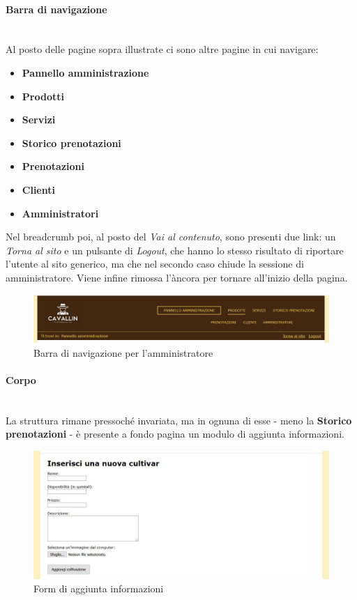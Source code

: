 \paragraph{Barra di navigazione}
~\\Al posto delle pagine sopra illustrate ci sono altre pagine in cui navigare:
\begin{itemize}
	\item \textbf{Pannello amministrazione}
	\item \textbf{Prodotti}
	\item \textbf{Servizi}
	\item \textbf{Storico prenotazioni}
	\item \textbf{Prenotazioni}
	\item \textbf{Clienti}
	\item \textbf{Amministratori}
\end{itemize}
Nel breadcrumb poi, al posto del \emph{Vai al contenuto}, sono presenti due link: un \emph{Torna al sito} e un pulsante di \emph{Logout}, che hanno lo stesso risultato di riportare l'utente al sito generico, ma che nel secondo caso chiude la sessione di amministratore. Viene infine rimossa l'àncora per tornare all'inizio della pagina.
\begin{figure}[h!]
	\centerline{\includegraphics[scale=0.49]{img/barra_navigazione_admin.jpg}}
	\caption{Barra di navigazione per l'amministratore}
	\label{fig:navbarAD}
\end{figure}
\paragraph{Corpo}
~\\La struttura rimane pressoché invariata, ma in ognuna di esse - meno la \textbf{Storico prenotazioni} - è presente a fondo pagina un modulo di aggiunta informazioni.
\begin{figure}[h!]
	\centerline{\includegraphics[scale=0.49]{img/add_form.jpg}}
	\caption{Form di aggiunta informazioni}
	\label{fig:addForm}
\end{figure}
